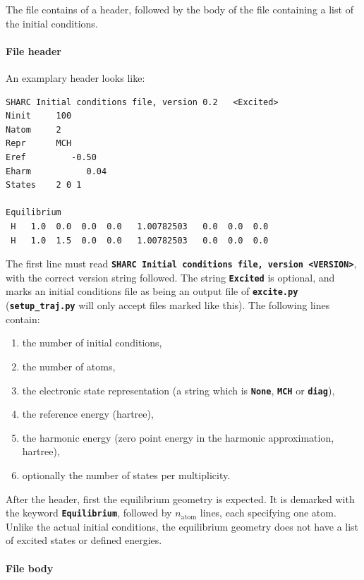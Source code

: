 \documentclass[a4paper,10pt,DIV=15,openany,twoside=false]{scrbook}
\newcommand{\ttt}[1]{\textbf{\texttt{#1}}}
\newenvironment{example}{
  \setlength{\OuterFrameSep}{3pt}
  \vspace{0mm}
  \definecolor{shadecolor}{HTML}{E4F4FF}
  \begin{shaded}
}{
  \end{shaded}
}
\begin{document}
The file contains of a header, followed by the body of the file containing a list of the initial conditions. 

\paragraph{File header}

An examplary header looks like:
\begin{example}
\footnotesize\begin{verbatim}
SHARC Initial conditions file, version 0.2   <Excited>
Ninit     100
Natom     2
Repr      MCH
Eref         -0.50
Eharm           0.04
States    2 0 1 

Equilibrium
 H   1.0  0.0  0.0  0.0   1.00782503   0.0  0.0  0.0
 H   1.0  1.5  0.0  0.0   1.00782503   0.0  0.0  0.0
\end{verbatim}
\end{example}
The first line must read \ttt{SHARC Initial conditions file, version <VERSION>}, with the correct version string followed. The string \ttt{Excited} is optional, and marks an initial conditions file as being an output file of \ttt{excite.py} (\ttt{setup\_traj.py} will only accept files marked like this). The following lines contain:
\begin{enumerate}
  \item the number of initial conditions, 
  \item the number of atoms,
  \item the electronic state representation (a string which is \ttt{None}, \ttt{MCH} or \ttt{diag}),
  \item the reference energy (hartree),
  \item the harmonic energy (zero point energy in the harmonic approximation, hartree),
  \item optionally the number of states per multiplicity.
\end{enumerate}

After the header, first the equilibrium geometry is expected. It is demarked with the keyword \ttt{Equilibrium}, followed by $n_\text{atom}$ lines, each specifying one atom. Unlike the actual initial conditions, the equilibrium geometry does not have a list of excited states or defined energies.

\paragraph{File body}
\end{document}
